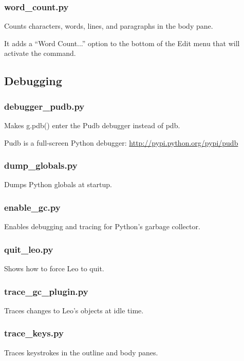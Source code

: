 \documentclass[a4paper,10pt,english]{sphinxmanual}
\begin{document}
\subsubsection{word\_count.py}
\label{plugins:word-count-py}
Counts characters, words, lines, and paragraphs in the body pane.

It adds a ``Word Count...'' option to the bottom of the Edit menu that will
activate the command.


\subsection{Debugging}
\label{plugins:debugging}

\subsubsection{debugger\_pudb.py}
\label{plugins:debugger-pudb-py}
Makes g.pdb() enter the Pudb debugger instead of pdb.

Pudb is a full-screen Python debugger:
\href{http://pypi.python.org/pypi/pudb}{http://pypi.python.org/pypi/pudb}


\subsubsection{dump\_globals.py}
\label{plugins:dump-globals-py}
Dumps Python globals at startup.


\subsubsection{enable\_gc.py}
\label{plugins:enable-gc-py}
Enables debugging and tracing for Python's garbage collector.


\subsubsection{quit\_leo.py}
\label{plugins:quit-leo-py}
Shows how to force Leo to quit.


\subsubsection{trace\_gc\_plugin.py}
\label{plugins:trace-gc-plugin-py}
Traces changes to Leo's objects at idle time.


\subsubsection{trace\_keys.py}
\label{plugins:trace-keys-py}
Traces keystrokes in the outline and body panes.
\end{document}
